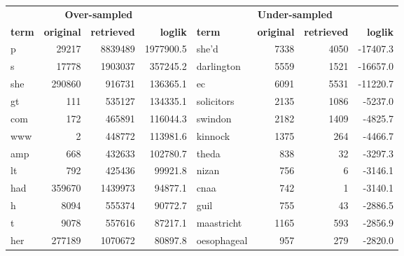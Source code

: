 \begin{table}[Htb]
    \centering
    \begin{tabular}{|lrrr||lrrr|}
        \hline
        \multicolumn{4}{|c||}{{\bf Over-sampled}}                       & \multicolumn{4}{c|}{{\bf Under-sampled}}                         \\ 
        {\bf term} & {\bf original} & {\bf retrieved} & {\bf loglik} & {\bf term}    & {\bf original} & {\bf retrieved} & {\bf loglik} \\ \hline
        p          & 29217          & 8839489         & 1977900.5    & she'd         & 7338           & 4050            & -17407.3     \\
        s          & 17778          & 1903037         & 357245.2     & darlington    & 5559           & 1521            & -16657.0     \\
        she        & 290860         & 916731          & 136365.1     & ec            & 6091           & 5531            & -11220.7     \\
        gt         & 111            & 535127          & 134335.1     & solicitors    & 2135           & 1086            & -5237.0      \\
        com        & 172            & 465891          & 116044.3     & swindon       & 2182           & 1409            & -4825.7      \\
        www        & 2              & 448772          & 113981.6     & kinnock       & 1375           & 264             & -4466.7      \\
        amp        & 668            & 432633          & 102780.7     & theda         & 838            & 32              & -3297.3      \\
        lt         & 792            & 425436          & 99921.8      & nizan         & 756            & 6               & -3146.1      \\
        had        & 359670         & 1439973         & 94877.1      & cnaa          & 742            & 1               & -3140.1      \\
        h          & 8094           & 555374          & 90772.7      & guil          & 755            & 43              & -2886.5      \\
        t          & 9078           & 557616          & 87217.1      & maastricht    & 1165           & 593             & -2856.9      \\
        her        & 277189         & 1070672         & 80897.8      & oesophageal   & 957            & 279             & -2820.0      \\

\end{tabular}
\end{table}
